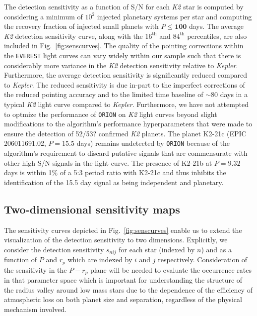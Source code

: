 \documentclass[twocolumn]{emulateapj}
\newcommand{\kepler}[1]{\emph{Kepler}#1}
\newcommand{\ktwo}[1]{\emph{K2}#1}
\begin{document}
The detection sensitivity as a function of S/N for each \ktwo{} star is computed by considering a minimum of
$10^2$ injected planetary systems per star and computing the recovery fraction of injected small planets with
$P \leq \textbf{100}$ days. The average \ktwo{} detection sensitivity curve, along with the
$16^{\text{th}}$ and $84^{\text{th}}$ percentiles, are also included in Fig.~\ref{fig:senscurves}. The quality
of the pointing corrections within the \texttt{EVEREST} light curves can vary widely within our sample such
that there is considerably more variance in the \ktwo{} detection sensitivity relative to \kepler{.} Furthermore,
the average detection sensitivity is significantly reduced compared to \kepler{.} %
The reduced sensitivity is due in-part to the imperfect corrections of the reduced pointing accuracy and
to the limited time baseline of $\sim 80$ days in a typical \ktwo{} light curve compared to \kepler{.} 
Furthermore, we have not attempted to optmize the performance of \texttt{ORION} on \ktwo{} light curves 
beyond slight modifications to the algorithm's performance hyperparameters that were made to ensure the
detection of 52/53? confirmed \ktwo{} planets. The planet K2-21c (EPIC 206011691.02, $P=15.5$ days)
remains undetected by \texttt{ORION} because of the algorithm's requirement to discard putative signals
that are commensurate with other high S/N signals in the light curve. The presence of K2-21b at $P=9.32$ days
is within 1\% of a 5:3 period ratio with K2-21c and thus inhibits the identification of the 15.5 day signal
as being independent and planetary.


\subsection{Two-dimensional sensitivity maps}
The sensitivity curves depicted in Fig.~\ref{fig:senscurves} enable us to extend the visualization of the
detection sensitivity to two dimensions. Explicitly, we consider the detection sensitivity
$s_{nij}$ for each star (indexed by $n$) and as a function of $P$ and $r_p$ which are indexed by $i$ and
$j$ respectively. Consideration of the sensitivity in the $P-r_p$ plane will be needed to evaluate the
occurrence rates in that parameter space which is important for understanding the structure of
the radius valley around low mass stars due to the dependence of the efficiency of atmospheric loss on
both planet size and separation, regardless of the physical mechanism involved. 
\end{document}
